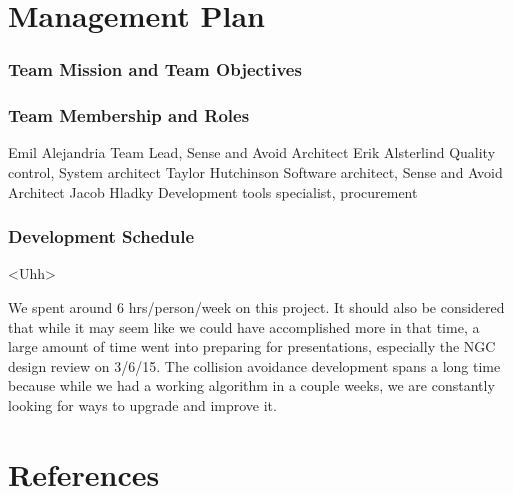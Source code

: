 \documentclass[12pt]{article}
\begin{document}
\section{Management Plan}
\subsubsection{Team Mission and Team Objectives}

\subsubsection{Team Membership and Roles}
Emil Alejandria                 	Team Lead, Sense and Avoid Architect
Erik Alsterlind                   	Quality control, System architect
Taylor Hutchinson           	Software architect, Sense and Avoid Architect
Jacob Hladky                    	Development tools specialist, procurement

\subsubsection{Development Schedule}

<Uhh>

	We spent around 6 hrs/person/week on this project. It should also be considered that while it may seem like we could have accomplished more in that time, a large amount of time went into preparing for presentations, especially the NGC design review on 3/6/15. The collision avoidance development spans a long time because while we had a working algorithm in a couple weeks, we are constantly looking for ways to upgrade and improve it. 

\section{References}
\end{document}
